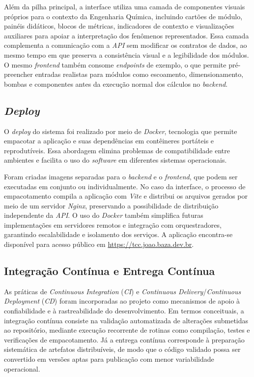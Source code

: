 Além da pilha principal, a interface utiliza uma camada de componentes visuais próprios para o contexto da Engenharia Química, incluindo cartões de módulo, painéis didáticos, blocos de métricas, indicadores de contexto e visualizações auxiliares para apoiar a interpretação dos fenômenos representados. Essa camada complementa a comunicação com a \textit{API} sem modificar os contratos de dados, ao mesmo tempo em que preserva a consistência visual e a legibilidade dos módulos. O mesmo \textit{frontend} também consome \textit{endpoints} de exemplo, o que permite pré-preencher entradas realistas para módulos como escoamento, dimensionamento, bombas e componentes antes da execução normal dos cálculos no \textit{backend}.

\subsection{\textit{Deploy}}
O \textit{deploy} do sistema foi realizado por meio de \textit{Docker}, tecnologia que permite empacotar a aplicação e suas dependências em contêineres portáteis e reprodutíveis. Essa abordagem elimina problemas de compatibilidade entre ambientes e facilita o uso do \textit{software} em diferentes sistemas operacionais.

Foram criadas imagens separadas para o \textit{backend} e o \textit{frontend}, que podem ser executadas em conjunto ou individualmente. No caso da interface, o processo de empacotamento compila a aplicação com \textit{Vite} e distribui os arquivos gerados por meio de um servidor \textit{Nginx}, preservando a possibilidade de distribuição independente da \textit{API}. O uso do \textit{Docker} também simplifica futuras implementações em servidores remotos e integração com orquestradores, garantindo escalabilidade e isolamento dos serviços. A aplicação encontra-se disponível para acesso público em \url{https://tcc.joao.baza.dev.br}.

\subsection{Integração Contínua e Entrega Contínua}

As práticas de \textit{Continuous Integration} (\textit{CI}) e \textit{Continuous Delivery}/\textit{Continuous Deployment} (\textit{CD}) foram incorporadas ao projeto como mecanismos de apoio à confiabilidade e à rastreabilidade do desenvolvimento. Em termos conceituais, a integração contínua consiste na validação automatizada de alterações submetidas ao repositório, mediante execução recorrente de rotinas como compilação, testes e verificações de empacotamento. Já a entrega contínua corresponde à preparação sistemática de artefatos distribuíveis, de modo que o código validado possa ser convertido em versões aptas para publicação com menor variabilidade operacional.


